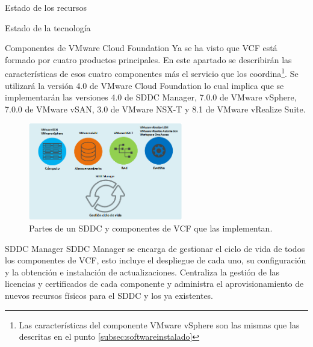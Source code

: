 \begin{chapter}{Estado de los recursos}
\begin{section}{Estado de la tecnología}
\begin{subsection}{Componentes de VMware Cloud Foundation}
Ya se ha visto que VCF está formado por cuatro productos principales. En este apartado se describirán las características de esos cuatro componentes más el servicio que los coordina\footnote{Las características del componente VMware vSphere son las mismas que las descritas en el punto \ref*{subsec:softwareinstalado}}. Se utilizará la versión 4.0 de VMware Cloud Foundation lo cual implica que se implementarán las versiones\cite{componentesCloudFound} 4.0 de SDDC Manager, 7.0.0 de VMware vSphere, 7.0.0 de VMware vSAN, 3.0 de VMware NSX-T y 8.1 de VMware vRealize Suite.
\begin{figure}[h]
    \centering
        \includegraphics[width=0.6\textwidth]{imaxes/VCF-componentes/ComponentesVCF.png}
        \caption{Partes de un SDDC y componentes de VCF que las implementan.}
        \label{fig:componentes-funciones-VCF}
    \end{figure}
    \FloatBarrier
\begin{subsubsection}{SDDC Manager}
    SDDC Manager se encarga de gestionar el ciclo de vida de todos los componentes de VCF, esto incluye el despliegue de cada uno, su configuración y la obtención e instalación de actualizaciones. Centraliza la gestión de las licencias y certificados de cada componente y administra el aprovisionamiento de nuevos recursos físicos para el SDDC y los ya existentes.
\end{subsubsection}


\end{subsection}
\end{section}
\end{chapter}
